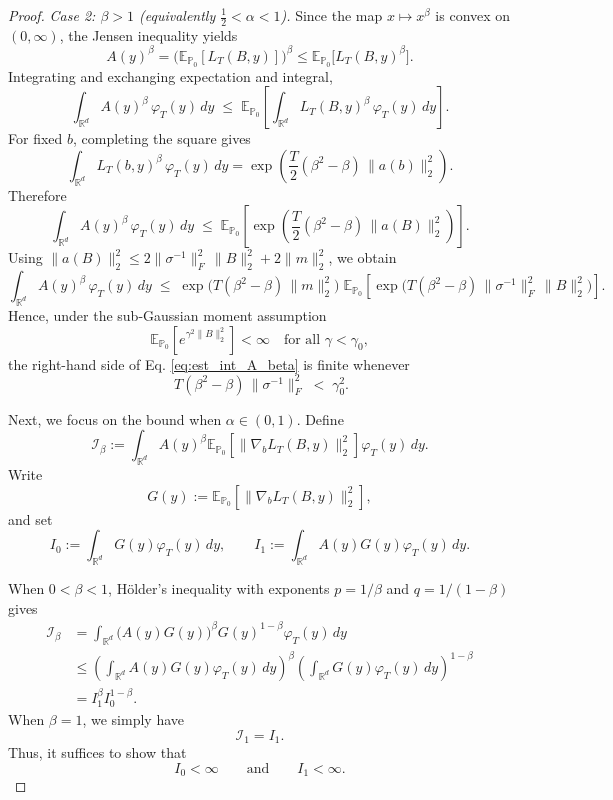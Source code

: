 \documentclass[11pt]{article}
\theoremstyle{definition}
\newcommand{\R}{\mathbb{R}}
\newcommand{\E}{\mathbb{E}}
\begin{document}
\begin{proof}
\medskip
\noindent\emph{Case 2: $\beta>1$ (equivalently $\tfrac12<\alpha<1$).}
Since the map $x\mapsto x^{\beta}$ is convex on $(0,\infty)$, the Jensen inequality yields
\[
A(y)^{\beta}=\big(\E_{\mathbb{P}_0}[L_T(B,y)]\big)^{\beta}\le \E_{\mathbb{P}_0}\big[L_T(B,y)^{\beta}\big].
\]
Integrating and exchanging expectation and integral,
\[
\int_{\R^d} A(y)^{\beta}\,\varphi_T(y)\,dy
\;\le\;
\E_{\mathbb{P}_0}\!\left[\int_{\R^d} L_T(B,y)^{\beta}\,\varphi_T(y)\,dy\right].
\]
For fixed $b$, completing the square gives
\[
\int_{\R^d} L_T(b,y)^{\beta}\,\varphi_T(y)\,dy
=\exp\!\left(\frac{T}{2}(\beta^2-\beta)\,\|a(b)\|_2^2\right).
\]
Therefore
\[
\int_{\R^d} A(y)^{\beta}\,\varphi_T(y)\,dy
\;\le\;
\E_{\mathbb{P}_0}\!\left[\exp\!\left(\frac{T}{2}(\beta^2-\beta)\,\|a(B)\|_2^2\right)\right].
\]
Using $\|a(B)\|_2^2\le 2\|\sigma^{-1}\|_F^2\,\|B\|_2^2+2\|m\|_2^2$, we obtain
\begin{equation}\label{eq:est_int_A_beta}
\int_{\R^d} A(y)^{\beta}\,\varphi_T(y)\,dy
\;\le\;
\exp\!\Big(T(\beta^2-\beta)\,\|m\|_2^2\Big)\;
\E_{\mathbb{P}_0}\!\left[\exp\!\Big(T(\beta^2-\beta)\,\|\sigma^{-1}\|_F^2\,\|B\|_2^2\Big)\right].
\end{equation}
Hence, under the sub-Gaussian moment assumption
\[
\E_{\mathbb{P}_0}\!\left[e^{\gamma^2\|B\|_2^2}\right]<\infty\quad\text{for all }\gamma<\gamma_0,
\]
the right-hand side of Eq. \eqref{eq:est_int_A_beta} is finite whenever
\begin{equation}\label{eq:easy-threshold}
\ T(\beta^2-\beta)\,\|\sigma^{-1}\|_F^2 \;<\; \gamma_0^2.
\end{equation}

Next, we focus on the bound when $\alpha\in(0,1)$. Define
\[
\mathcal I_\beta
:=
\int_{\R^d}
A(y)^\beta
\E_{\mathbb P_0}
\left[
\|\nabla_bL_T(B,y)\|_2^2
\right]
\varphi_T(y)\,dy.
\]
Write
\[
G(y)
:=
\E_{\mathbb P_0}
\left[
\|\nabla_bL_T(B,y)\|_2^2
\right],
\]
and set
\[
I_0
:=
\int_{\R^d}G(y)\varphi_T(y)\,dy,
\qquad
I_1
:=
\int_{\R^d}A(y)G(y)\varphi_T(y)\,dy.
\]

When $0<\beta<1$, H\"older's inequality with exponents
$p=1/\beta$ and $q=1/(1-\beta)$ gives
\begin{equation}\label{eq:Ibeta-interpolate}
\begin{aligned}
\mathcal I_\beta
&=
\int_{\R^d}
\bigl(A(y)G(y)\bigr)^\beta
G(y)^{1-\beta}
\varphi_T(y)\,dy \\
&\leq
\left(
\int_{\R^d}A(y)G(y)\varphi_T(y)\,dy
\right)^\beta
\left(
\int_{\R^d}G(y)\varphi_T(y)\,dy
\right)^{1-\beta} \\
&=
I_1^\beta I_0^{1-\beta}.
\end{aligned}
\end{equation}
When $\beta=1$, we simply have
\[
\mathcal I_1=I_1.
\]
Thus, it suffices to show that
\[
I_0<\infty
\qquad\text{and}\qquad
I_1<\infty.
\]


\end{proof}
\end{document}
